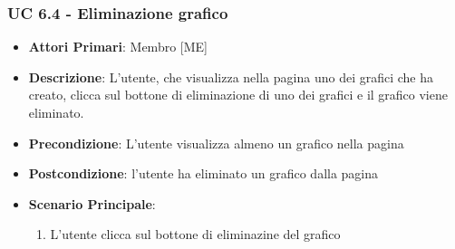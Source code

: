 			\subsubsection{UC 6.4 - Eliminazione grafico}
			\begin{itemize}
				\item \textbf{Attori Primari}: Membro [ME]
				\item \textbf{Descrizione}: L'utente, che visualizza nella pagina uno dei grafici che ha creato, clicca sul bottone di eliminazione di uno dei grafici e il grafico viene eliminato.
				\item \textbf{Precondizione}: L'utente visualizza almeno un grafico nella pagina
				\item \textbf{Postcondizione}: l'utente ha eliminato un grafico dalla pagina
				\item \textbf{Scenario Principale}:
				\begin{enumerate}
					\item{L'utente clicca sul bottone di eliminazine del grafico}
				\end{enumerate}	
			\end{itemize}